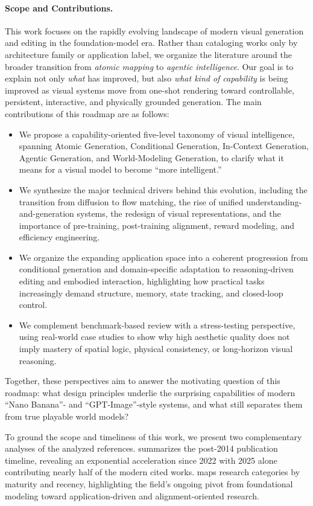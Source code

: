 \documentclass{llmxive}
\begin{document}
\paragraph{Scope and Contributions.}
This work focuses on the rapidly evolving landscape of modern visual generation and editing in the foundation-model era. Rather than cataloging works only by architecture family or application label, we organize the literature around the broader transition from \emph{atomic mapping} to \emph{agentic intelligence}. Our goal is to explain not only \emph{what} has improved, but also \emph{what kind of capability} is being improved as visual systems move from one-shot rendering toward controllable, persistent, interactive, and physically grounded generation. The main contributions of this roadmap are as follows:
\begin{itemize}[leftmargin=*]
\item We propose a capability-oriented five-level taxonomy of visual intelligence, spanning Atomic Generation, Conditional Generation, In-Context Generation, Agentic Generation, and World-Modeling Generation, to clarify what it means for a visual model to become ``more intelligent.''
\item We synthesize the major technical drivers behind this evolution, including the transition from diffusion to flow matching, the rise of unified understanding-and-generation systems, the redesign of visual representations, and the importance of pre-training, post-training alignment, reward modeling, and efficiency engineering.
\item We organize the expanding application space into a coherent progression from conditional generation and domain-specific adaptation to reasoning-driven editing and embodied interaction, highlighting how practical tasks increasingly demand structure, memory, state tracking, and closed-loop control.
\item We complement benchmark-based review with a stress-testing perspective, using real-world case studies to show why high aesthetic quality does not imply mastery of spatial logic, physical consistency, or long-horizon visual reasoning.
\end{itemize}
Together, these perspectives aim to answer the motivating question of this roadmap: what design principles underlie the surprising capabilities of modern ``Nano Banana''- and ``GPT-Image''-style systems, and what still separates them from true playable world models?


To ground the scope and timeliness of this work, we present two complementary analyses of the analyzed references.  summarizes the post-2014 publication timeline, revealing an exponential acceleration since 2022 with 2025 alone contributing nearly half of the modern cited works.  maps research categories by maturity and recency, highlighting the field's ongoing pivot from foundational modeling toward application-driven and alignment-oriented research.
\end{document}
